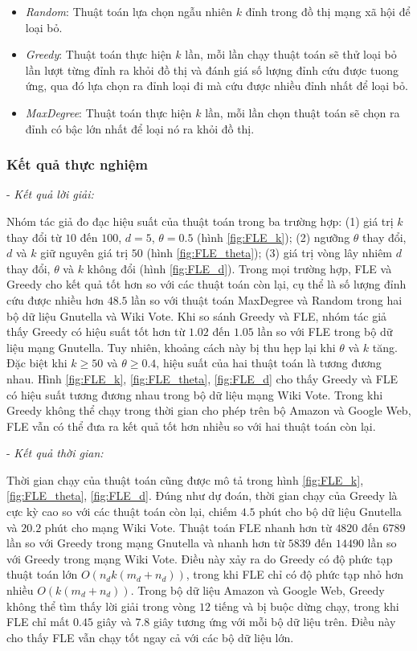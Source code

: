 \begin{itemize}
	\item {\itshape Random}: Thuật toán lựa chọn ngẫu nhiên $k$ đỉnh trong đồ thị mạng xã hội để loại bỏ.
	\item {\itshape Greedy}: Thuật toán thực hiện $k$ lần, mỗi lần chạy thuật toán sẽ thử loại bỏ lần lượt từng đỉnh ra khỏi đồ thị và đánh giá số lượng đỉnh cứu được tuong ứng, qua đó lựa chọn ra đỉnh loại đi mà cứu được nhiều đỉnh nhất để loại bỏ.
	\item {\itshape MaxDegree}: Thuật toán thực hiện $k$ lần, mỗi lần chọn thuật toán sẽ chọn ra đỉnh có bậc lớn nhất để loại nó ra khỏi đồ thị. 
\end{itemize} 

\subsubsection{Kết quả thực nghiệm}

- {\itshape Kết quả lời giải:}

Nhóm tác giả đo đạc hiệu suất của thuật toán trong ba trường hợp: (1) giá trị $k$ thay đổi từ $10$ đến $100$, $d=5$, $\theta=0.5$ (hình \ref{fig:FLE_k}); (2) ngưỡng $\theta$ thay đổi, $d$ và $k$ giữ nguyên giá trị $50$ (hình \ref{fig:FLE_theta}); (3) giá trị vòng lây nhiêm $d$ thay đổi, $\theta$ và $k$ không đổi (hình \ref{fig:FLE_d}). Trong mọi trường hợp, FLE và Greedy cho kết quả tốt hơn so với các thuật toán còn lại, cụ thể là số lượng đỉnh cứu được nhiều hơn $48.5$ lần so với thuật toán MaxDegree và Random trong hai bộ dữ liệu Gnutella và Wiki Vote. Khi so sánh Greedy và FLE, nhóm tác giả thấy Greedy có hiệu suất tốt hơn từ $1.02$ đến $1.05$ lần so với FLE trong bộ dữ liệu mạng Gnutella. Tuy nhiên, khoảng cách này bị thu hẹp lại khi $\theta$ và $k$ tăng. Đặc biệt khi $k \geq 50$ và $\theta \geq 0.4$, hiệu suất của hai thuật toán là tương đương nhau. Hình \ref{fig:FLE_k}, \ref{fig:FLE_theta}, \ref{fig:FLE_d} cho thấy Greedy và FLE có hiệu suất tương đương nhau trong bộ dữ liệu mạng Wiki Vote. Trong khi Greedy không thể chạy trong thời gian cho phép trên bộ Amazon và Google Web, FLE vẫn có thể đưa ra kết quả tốt hơn nhiều so với hai thuật toán còn lại.

- {\itshape Kết quả thời gian:}

Thời gian chạy của thuật toán cũng được mô tả trong hình \ref{fig:FLE_k}, \ref{fig:FLE_theta}, \ref{fig:FLE_d}. Đúng như dự đoán, thời gian chạy của Greedy là cực kỳ cao so với các thuật toán còn lại, chiếm $4.5$ phút cho bộ dữ liệu Gnutella và $20.2$ phút cho mạng Wiki Vote. Thuật toán FLE nhanh hơn từ $4820$ đến $6789$ lần so với Greedy trong mạng Gnutella và nhanh hơn từ $5839$ đến $14490$ lần so với Greedy trong mạng Wiki Vote. Điều này xảy ra do Greedy có độ phức tạp thuật toán lớn $O(n_{d}k(m_{d}+n_{d}))$, trong khi FLE chỉ có độ phức tạp nhỏ hơn nhiều $O(k(m_{d}+n_{d}))$. Trong bộ dữ liệu Amazon và Google Web, Greedy không thể tìm thấy lời giải trong vòng $12$ tiếng và bị buộc dừng chạy, trong khi FLE chỉ mất $0.45$ giây và $7.8$ giây tương ứng với mỗi bộ dữ liệu trên. Điều này cho thấy FLE vẫn chạy tốt ngay cả với các bộ dữ liệu lớn.

